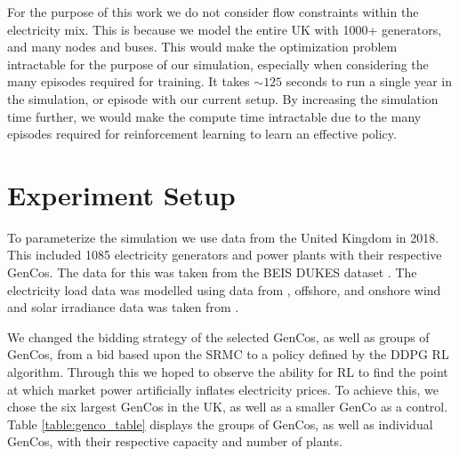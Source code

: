 For the purpose of this work we do not consider flow constraints within the electricity mix. This is because we model the entire UK with 1000+ generators, and many nodes and buses. This would make the optimization problem intractable for the purpose of our simulation, especially when considering the many episodes required for training. It takes ${\sim}125$ seconds to run a single year in the simulation, or episode with our current setup. By increasing the simulation time further, we would make the compute time intractable due to the many episodes required for reinforcement learning to learn an effective policy.










\section{Experiment Setup}
\label{sec:methodology}


To parameterize the simulation we use data from the United Kingdom in 2018. This included 1085 electricity generators and power plants with their respective GenCos. The data for this was taken from the BEIS DUKES dataset \cite{dukes_511}. The electricity load data was modelled using data from \cite{gridwatch}, offshore, and onshore wind and solar irradiance data was taken from \cite{Pfenninger2016}.

We changed the bidding strategy of the selected GenCos, as well as groups of GenCos, from a bid based upon the SRMC to a policy defined by the DDPG RL algorithm. Through this we hoped to observe the ability for RL to find the point at which market power  artificially inflates electricity prices. To achieve this, we chose the six largest GenCos in the UK, as well as a smaller GenCo as a control. Table \ref{table:genco_table} displays the groups of GenCos, as well as individual GenCos, with their respective capacity and number of plants.





